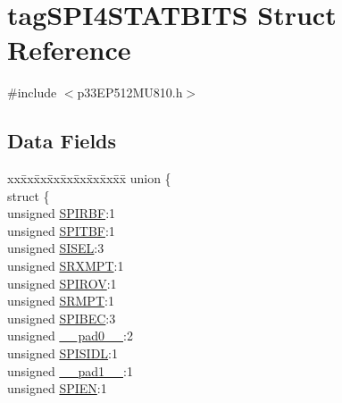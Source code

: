 \hypertarget{structtag_s_p_i4_s_t_a_t_b_i_t_s}{}\section{tag\+S\+P\+I4\+S\+T\+A\+T\+B\+I\+TS Struct Reference}
\label{structtag_s_p_i4_s_t_a_t_b_i_t_s}


{\ttfamily \#include $<$p33\+E\+P512\+M\+U810.\+h$>$}

\subsection*{Data Fields}
\begin{DoxyCompactItemize}
\item 
\begin{tabbing}
xx\=xx\=xx\=xx\=xx\=xx\=xx\=xx\=xx\=\kill
union \{\\
\>struct \{\\
\>\>unsigned \hyperlink{structtag_s_p_i4_s_t_a_t_b_i_t_s_aca81e0734a11061cfacfc4eeab87e4e9}{SPIRBF}:1\\
\>\>unsigned \hyperlink{structtag_s_p_i4_s_t_a_t_b_i_t_s_ad0edcfb75c96ed94138b2b1995ca0a91}{SPITBF}:1\\
\>\>unsigned \hyperlink{structtag_s_p_i4_s_t_a_t_b_i_t_s_a0aae6d6bf32c0591c0771f0947256bbc}{SISEL}:3\\
\>\>unsigned \hyperlink{structtag_s_p_i4_s_t_a_t_b_i_t_s_ac20c62c315f5e27133de699867a5072e}{SRXMPT}:1\\
\>\>unsigned \hyperlink{structtag_s_p_i4_s_t_a_t_b_i_t_s_a53721ff21767e781162f289a006cad5f}{SPIROV}:1\\
\>\>unsigned \hyperlink{structtag_s_p_i4_s_t_a_t_b_i_t_s_a4682f59fe87ae9344722baf5b4e0ab97}{SRMPT}:1\\
\>\>unsigned \hyperlink{structtag_s_p_i4_s_t_a_t_b_i_t_s_a2e2480d221f198907a6594dd78a2a234}{SPIBEC}:3\\
\>\>unsigned \hyperlink{structtag_s_p_i4_s_t_a_t_b_i_t_s_adf71f3d8410c1f1dbbc96680a92c49af}{\_\_pad0\_\_}:2\\
\>\>unsigned \hyperlink{structtag_s_p_i4_s_t_a_t_b_i_t_s_a73d48e3f46331c0141085ce1b20bcda4}{SPISIDL}:1\\
\>\>unsigned \hyperlink{structtag_s_p_i4_s_t_a_t_b_i_t_s_acaf2d0924a107ec6e8d2e31febaf66f9}{\_\_pad1\_\_}:1\\
\>\>unsigned \hyperlink{structtag_s_p_i4_s_t_a_t_b_i_t_s_abfc32d788a158c98350adfdd625de985}{SPIEN}:1\\

\end{tabbing}
\end{DoxyCompactItemize}
